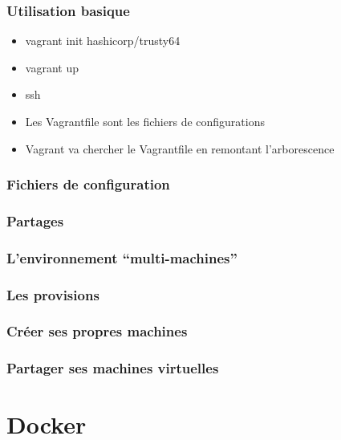 \documentclass{beamer}
\begin{document}
    \subsubsection{Utilisation basique}
    \begin{frame}
        \begin{itemize}
            \item{vagrant init hashicorp/trusty64}
            \item{vagrant up}
            \item{ssh}
        \end{itemize}

        \begin{itemize}
            \item{Les Vagrantfile sont les fichiers de configurations}
            \item{Vagrant va chercher le Vagrantfile en remontant l'arborescence}
        \end{itemize}
    \end{frame}

    \subsubsection{Fichiers de configuration}
    \begin{frame}
    \end{frame}
    
    \subsubsection{Partages}
    \begin{frame}
    \end{frame}

         \begin{frame}
         \end{frame}

    \subsubsection{L'environnement ``multi-machines''}
    \begin{frame}
    \end{frame}

    \subsubsection{Les provisions}
    \begin{frame}
    \end{frame}

    \subsubsection{Créer ses propres machines}
    \begin{frame}
    \end{frame}

    \subsubsection{Partager ses machines virtuelles}
    \begin{frame}
    \end{frame}
    
    
    \section{Docker}
\end{document}
